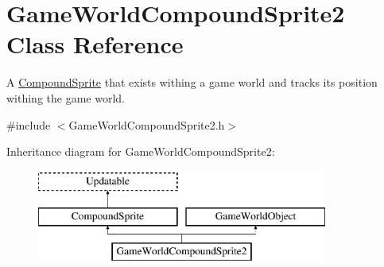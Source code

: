 \hypertarget{class_game_world_compound_sprite2}{}\section{Game\+World\+Compound\+Sprite2 Class Reference}
\label{class_game_world_compound_sprite2}


A \hyperlink{class_compound_sprite}{Compound\+Sprite} that exists withing a game world and tracks its position withing the game world.  




{\ttfamily \#include $<$Game\+World\+Compound\+Sprite2.\+h$>$}

Inheritance diagram for Game\+World\+Compound\+Sprite2\+:\begin{figure}[H]
\begin{center}
\leavevmode
\includegraphics[height=3.000000cm]{class_game_world_compound_sprite2}
\end{center}
\end{figure}
